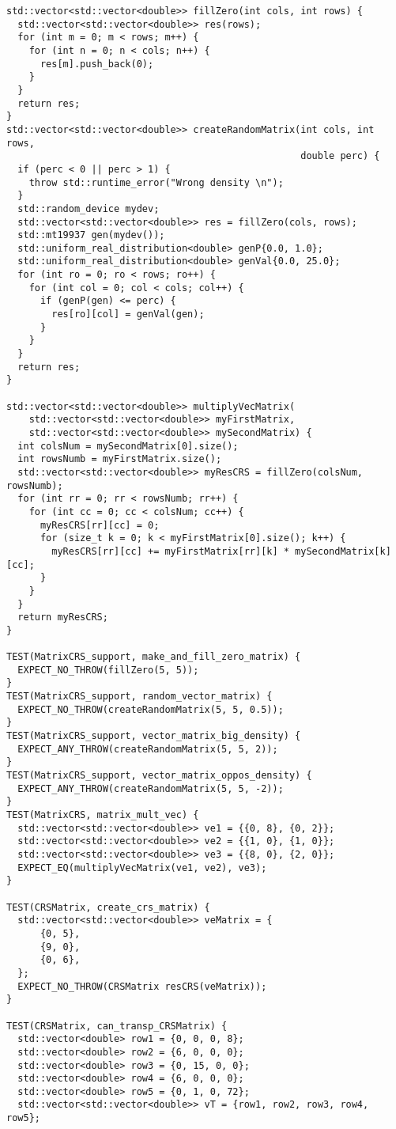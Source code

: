 \documentclass[14pt, russian]{extarticle}
\begin{document}
\begin{lstlisting}
std::vector<std::vector<double>> fillZero(int cols, int rows) {
  std::vector<std::vector<double>> res(rows);
  for (int m = 0; m < rows; m++) {
    for (int n = 0; n < cols; n++) {
      res[m].push_back(0);
    }
  }
  return res;
}
std::vector<std::vector<double>> createRandomMatrix(int cols, int rows,
                                                    double perc) {
  if (perc < 0 || perc > 1) {
    throw std::runtime_error("Wrong density \n");
  }
  std::random_device mydev;
  std::vector<std::vector<double>> res = fillZero(cols, rows);
  std::mt19937 gen(mydev());
  std::uniform_real_distribution<double> genP{0.0, 1.0};
  std::uniform_real_distribution<double> genVal{0.0, 25.0};
  for (int ro = 0; ro < rows; ro++) {
    for (int col = 0; col < cols; col++) {
      if (genP(gen) <= perc) {
        res[ro][col] = genVal(gen);
      }
    }
  }
  return res;
}

std::vector<std::vector<double>> multiplyVecMatrix(
    std::vector<std::vector<double>> myFirstMatrix,
    std::vector<std::vector<double>> mySecondMatrix) {
  int colsNum = mySecondMatrix[0].size();
  int rowsNumb = myFirstMatrix.size();
  std::vector<std::vector<double>> myResCRS = fillZero(colsNum, rowsNumb);
  for (int rr = 0; rr < rowsNumb; rr++) {
    for (int cc = 0; cc < colsNum; cc++) {
      myResCRS[rr][cc] = 0;
      for (size_t k = 0; k < myFirstMatrix[0].size(); k++) {
        myResCRS[rr][cc] += myFirstMatrix[rr][k] * mySecondMatrix[k][cc];
      }
    }
  }
  return myResCRS;
}

TEST(MatrixCRS_support, make_and_fill_zero_matrix) {
  EXPECT_NO_THROW(fillZero(5, 5));
}
TEST(MatrixCRS_support, random_vector_matrix) {
  EXPECT_NO_THROW(createRandomMatrix(5, 5, 0.5));
}
TEST(MatrixCRS_support, vector_matrix_big_density) {
  EXPECT_ANY_THROW(createRandomMatrix(5, 5, 2));
}
TEST(MatrixCRS_support, vector_matrix_oppos_density) {
  EXPECT_ANY_THROW(createRandomMatrix(5, 5, -2));
}
TEST(MatrixCRS, matrix_mult_vec) {
  std::vector<std::vector<double>> ve1 = {{0, 8}, {0, 2}};
  std::vector<std::vector<double>> ve2 = {{1, 0}, {1, 0}};
  std::vector<std::vector<double>> ve3 = {{8, 0}, {2, 0}};
  EXPECT_EQ(multiplyVecMatrix(ve1, ve2), ve3);
}

TEST(CRSMatrix, create_crs_matrix) {
  std::vector<std::vector<double>> veMatrix = {
      {0, 5},
      {9, 0},
      {0, 6},
  };
  EXPECT_NO_THROW(CRSMatrix resCRS(veMatrix));
}

TEST(CRSMatrix, can_transp_CRSMatrix) {
  std::vector<double> row1 = {0, 0, 0, 8};
  std::vector<double> row2 = {6, 0, 0, 0};
  std::vector<double> row3 = {0, 15, 0, 0};
  std::vector<double> row4 = {6, 0, 0, 0};
  std::vector<double> row5 = {0, 1, 0, 72};
  std::vector<std::vector<double>> vT = {row1, row2, row3, row4, row5};


\end{lstlisting}
\end{document}
